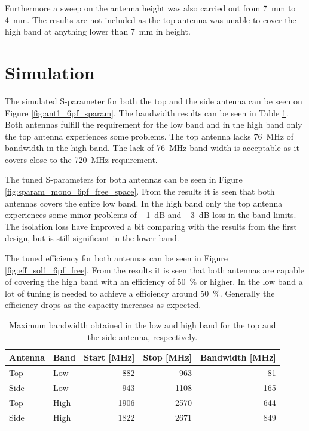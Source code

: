 Furthermore a sweep on the antenna height was also carried out from \SI{7}{mm} to \SI{4}{mm}. The results are not included as the top antenna was unable to cover the high band at anything lower than \SI{7}{mm} in height.

\FloatBarrier
\section{Simulation}

The simulated S-parameter for both the top and the side antenna can be seen on Figure \ref{fig:ant1_6pf_sparam}. The bandwidth results can be seen in Table \ref{tab:bw_sol1_6pf}. Both antennas fulfill the requirement for the low band and in the high band only the top antenna experiences some problems. The top antenna lacks \SI{76}{MHz} of bandwidth in the high band. The lack of \SI{76}{MHz} band width is acceptable as it covers close to the \SI{720}{MHz} requirement.

The tuned S-parameters for both antennas can be seen in Figure \ref{fig:sparam_mono_6pf_free_space}. From the results it is seen that both antennas covers the entire low band. In the high band only the top antenna experiences some minor problems of \SI{-1}{dB} and \SI{-3}{dB} loss in the band limits. The isolation loss have improved a bit comparing with the results from the first design, but is still significant in the lower band.     

The tuned efficiency for both antennas can be seen in Figure \ref{fig:eff_sol1_6pf_free}. From the results it is seen that both antennas are capable of covering the high band with an efficiency of \SI{50}{\percent} or higher. In the low band a lot of tuning is needed to achieve a efficiency around \SI{50}{\percent}. Generally the efficiency drops as the capacity increases as expected.  

\begin{table}
  \centering
  \begin{tabular}{|l|l|r|r|r|}
    \hline
    Antenna & Band & Start [MHz] & Stop [MHz] & Bandwidth [MHz] \\
    \hline
    Top     & Low  & 882         & 963       & 81 \\
    Side    & Low  & 943         & 1108        & 165 \\
    \hline
    Top     & High & 1906        & 2570       & 644 \\
    Side    & High & 1822        & 2671       & 849 \\
    \hline
  \end{tabular}
  \caption{Maximum bandwidth obtained in the low and high band for the top and the side antenna, respectively.}
  \label{tab:bw_sol1_6pf}
\end{table}

